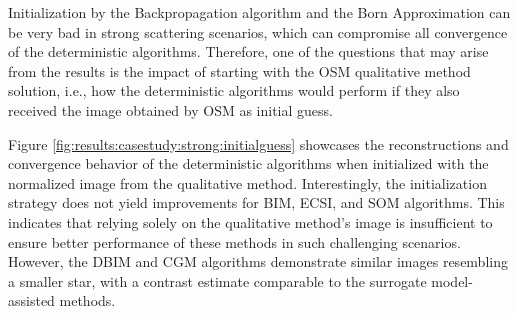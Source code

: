 		
			Initialization by the Backpropagation algorithm and the Born Approximation can be very bad in strong scattering scenarios, which can compromise all convergence of the deterministic algorithms. Therefore, one of the questions that may arise from the results is the impact of starting with the OSM qualitative method solution, i.e., how the deterministic algorithms would perform if they also received the image obtained by OSM as initial guess.
		
			Figure \ref{fig:results:casestudy:strong:initialguess} showcases the reconstructions and convergence behavior of the deterministic algorithms when initialized with the normalized image from the qualitative method. Interestingly, the initialization strategy does not yield improvements for BIM, ECSI, and SOM algorithms. This indicates that relying solely on the qualitative method's image is insufficient to ensure better performance of these methods in such challenging scenarios. However, the DBIM and CGM algorithms demonstrate similar images resembling a smaller star, with a contrast estimate comparable to the surrogate model-assisted methods.
			

